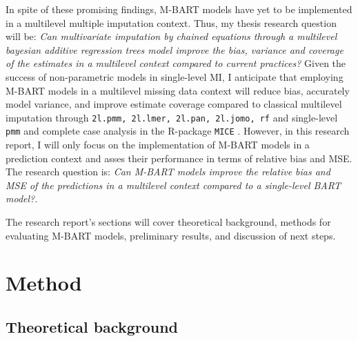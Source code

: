 \documentclass[10pt, a4paper, titlepage]{article}
\begin{document}
In spite of these promising findings, M-BART models have yet to be implemented in a multilevel multiple imputation context. Thus, my thesis research question will be: \textit{Can multivariate imputation by chained equations through a multilevel bayesian additive regression trees model improve the bias, variance and coverage of the estimates in a multilevel context compared to current practices?} Given the success of non-parametric models in single-level MI, I anticipate that employing M-BART models in a multilevel missing data context will reduce bias, accurately model variance, and improve estimate coverage compared to classical multilevel imputation through \texttt{2l.pmm, 2l.lmer, 2l.pan, 2l.jomo, rf} and single-level \texttt{pmm} and complete case analysis in the R-package \texttt{MICE} \citep{buuren2011}. However, in this research report, I will only focus on the implementation of M-BART models in a prediction context and asses their performance in terms of relative bias and MSE. The research question is: \textit{Can M-BART models improve the relative bias and MSE of the predictions in a multilevel context compared to a single-level BART model?}.

The research report's sections will cover theoretical background, methods for evaluating M-BART models, preliminary results, and discussion of next steps.

\section{Method}
\subsection{Theoretical background}
\end{document}
